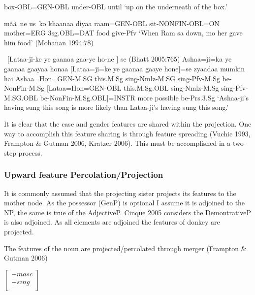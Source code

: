 \documentclass{article}
\begin{document}
\begin{example}
box-OBL=GEN-OBL  under-OBL  until
\glt `up  on the underneath of  the box.'
\glend
\end{example}

\begin{example}
    mãã~ne  us~ko    khaanaa  diyaa
raam=GEN-OBL  sit-NONFIN-OBL=ON  mother=ERG  3sg.OBL=DAT  food   give-Pfv
\glt `When Ram sa  down, mo her gave him food' (Mohanan 1994:78)
\glend
\end{example}

\begin{example} ~[Lataa-ji-ke ye gaanaa gaa-ye ho-ne ] se (Bhatt 2005:765)
\gll Ashaa=ji=ka ye gaanaa gaayaa honaa [Lataa=ji=ke ye gaanaa gaaye hone]=se zyaadaa mumkin hai
Ashaa=Hon=GEN-M.SG this.M.Sg sing-Nmlz-M.SG sing-Pfv-M.Sg be-NonFin-M.Sg [Lataa=Hon=GEN-OBL this.M.Sg.OBL sing-Nmlz-M.Sg sing-Pfv-M.SG.OBL be-NonFin-M.Sg.OBL]=INSTR more possible be-Prs.3.Sg
\glt `Ashaa-ji's having sung this song is more likely than Lataa-ji's having sung this song.'
\glend
\end{example}



It is clear that the case and gender features are shared within the projection. One way to accomplish this feature sharing is through feature spreading (Vuchic 1993, Frampton \& Gutman 2006, Kratzer 2006). This must be accomplished in a two-step process.


\subsubsection{Upward feature Percolation/Projection}

It is commonly assumed that the projecting sister projects its features to the mother node. As the possessor (GenP) is optional I assume it is adjoined to the NP, the same is true of the AdjectiveP. Cinque 2005 considers the DemontrativeP is also adjoined. As all elements are adjoined the features of donkey are projected.

\begin{example}The features of the noun are projected/percolated through merger (Frampton \& Gutman 2006)

$\left[ \begin{array}{l}
 +masc\\
 +sing\\
 \end{array} \right]$

\end{example}
\end{document}
